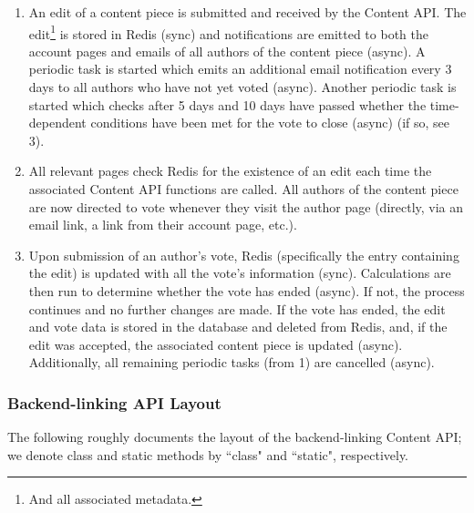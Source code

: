 \documentclass[12pt,letterpaper]{article}
\begin{document}
\begin{enumerate}
\item[1.] An edit of a content piece is submitted and received by the Content API. The edit\footnote{And all associated metadata.} is stored in Redis (sync) and notifications are emitted to both the account pages and emails of all authors of the content piece (async). A periodic task is started which emits an additional email notification every 3 days to all authors who have not yet voted (async). Another periodic task is started which checks after 5 days and 10 days have passed whether the time-dependent conditions have been met for the vote to close (async) (if so, see 3).
\item[2.] All relevant pages check Redis for the existence of an edit each time the associated Content API functions are called. All authors of the content piece are now directed to vote whenever they visit the author page (directly, via an email link, a link from their account page, etc.). 
\item[3.] Upon submission of an author's vote, Redis (specifically the entry containing the edit) is updated with all the vote's information (sync). Calculations are then run to determine whether the vote has ended (async). If not, the process continues and no further changes are made. If the vote has ended, the edit and vote data is stored in the database and deleted from Redis, and, if the edit was accepted, the associated content piece is updated (async). Additionally, all remaining periodic tasks (from 1) are cancelled (async).
\end{enumerate}



\subsubsection{Backend-linking API Layout}

The following roughly documents the layout of the backend-linking Content API; we denote class and static methods by ``class" and ``static", respectively.
\end{document}
